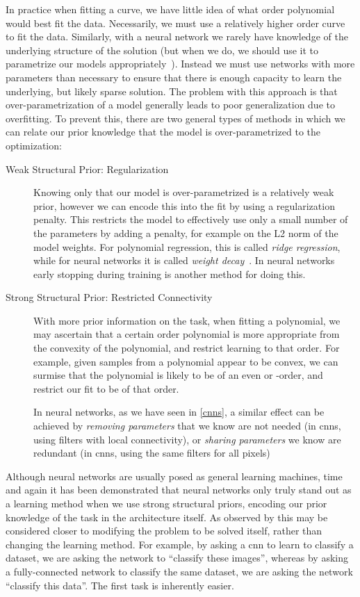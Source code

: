 \documentclass[thesis]{subfiles}
\begin{document}
	In practice when fitting a curve, we have little idea of what order polynomial would best fit the data. Necessarily, we must use a relatively higher order curve to fit the data. Similarly, with a neural network we rarely have knowledge of the underlying structure of the solution (but when we do, we should use it to parametrize our models appropriately~\citep{jain2016structural}). Instead we must use networks with more parameters than necessary to ensure that there is enough capacity to learn the underlying, but likely sparse solution. The problem with this approach is that over-parametrization of a model generally leads to poor generalization due to overfitting. To prevent this, there are two general types of methods in which we can relate our prior knowledge that the model is over-parametrized to the optimization:
	\begin{description}
	\item[Weak Structural Prior: Regularization]
	Knowing only that our model is over-parametrized is a relatively weak prior, however we can encode this into the fit by using a regularization penalty. This restricts the model to effectively use only a small number of the parameters by adding a penalty, for example on the L2 norm of the model weights. For polynomial regression, this is called \emph{ridge regression}, while for neural networks it is called \emph{weight decay}~\citep{hinton1987learning}. In neural networks early stopping during training is another method for doing this.
	
	\item[Strong Structural Prior: Restricted Connectivity]
	With more prior information on the task, \ie when fitting a polynomial, we may ascertain that a certain order polynomial is more appropriate from the convexity of the polynomial, and restrict learning to that order. For example, given samples from a polynomial appear to be convex, we can surmise that the polynomial is likely to be of an even or -order, and restrict our fit to be of that order. 

	In neural networks, as we have seen in \cref{cnns}, a similar effect can be achieved by \emph{removing parameters} that we know are not needed (\ie  in \glspl{cnn}, using filters with local connectivity), or \emph{sharing parameters} we know are redundant (\ie in \glspl{cnn}, using the same filters for all pixels)
    \end{description}
    
	Although neural networks are usually posed as general learning machines, time and again it has been demonstrated that neural networks only truly stand out as a learning method when we use strong structural priors, encoding our prior knowledge of the task in the architecture itself. As observed by \citet{denker1987large} this may be considered closer to modifying the problem to be solved itself, rather than changing the learning method. For example, by asking a \gls{cnn} to learn to classify a dataset, we are asking the network to ``classify these images'', whereas by asking a fully-connected network to classify the same dataset, we are asking the network ``classify this data''. The first task is inherently easier.
\end{document}
